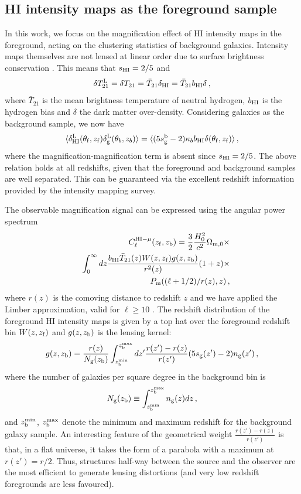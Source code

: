 \documentclass[useAMS,usenatbib]{mnras}
\newcommand{\be}{\begin{equation}}
\newcommand{\ee}{\end{equation}}
\newcommand{\bea}{\begin{eqnarray}}
\newcommand{\eea}{\end{eqnarray}}
\begin{document}
\subsection{ HI intensity maps as the foreground sample}

In this work, we focus on the magnification effect of HI intensity maps in the foreground, acting on the clustering statistics of background galaxies. Intensity maps themselves are not lensed at linear order due to surface brightness conservation \citep{PhysRevD.87.064026}. This means that $s_{\rm HI} = 2/5$ and
\be
\delta T^{\rm L}_{21}=\delta T_{21}=\bar{T}_{21} \delta_{\rm HI} = \bar{T}_{21} b_{\rm HI} \delta \, ,
\ee where $\bar{T}_{21}$ is the mean brightness temperature of neutral hydrogen, $b_{\rm HI}$ is the hydrogen bias and $\delta$ the dark matter over-density. Considering galaxies as the background sample, we now have
\be
\langle \delta^{\rm L}_{\rm HI}(\theta_{\rm f},z_{\rm f}) \delta^{\rm L}_{\rm g}(\theta_b,z_b) \rangle
= \langle (5s^{\rm b}_{\rm g}-2) \kappa_b  b_{\rm HI} \delta (\theta_{\rm f},z_{\rm f}) \rangle \, ,
\ee
where the magnification-magnification term is absent since $s_{\rm HI}=2/5$. The above relation holds at all redshifts, given that the foreground and background samples are well separated. This can be guaranteed via the excellent redshift information provided by the intensity mapping survey.

The observable magnification signal can be expressed using the angular power spectrum \citep{2006MNRAS.367..169Z,2008PhRvD..78l3517Z}
\bea
\label{eq:clhimu}
&&C^{{\rm HI} - \mu}_\ell (z_{\rm f}, z_{\rm b}) = \frac{3}{2}\frac{H^2_0}{c^2}\Omega_{{\rm m},0} \times  \nonumber \\
&& \int^{\infty}_0 dz \frac{b_{\rm HI}\bar{T}_{21}(z)W(z,z_{\rm f})g(z,z_{\rm b})}{r^2(z)}(1+z) \times \nonumber \\
&& P_{\rm m}((\ell+1/2)/r(z),z) \, ,
\eea
where $r(z)$ is the comoving distance to redshift $z$ and we have applied the Limber approximation, valid for $\ell \geq 10$ \citep{1954ApJ...119..655L,2008PhRvD..78l3506L}. The redshift distribution of the foreground HI intensity maps is given by a top hat over the foreground redshift bin $W(z,z_{\rm f})$ and $g(z,z_{\rm b})$ is the lensing kernel:
\be
g(z,z_{\rm b})=\frac{r(z)}{N_{\rm g}(z_{\rm b})}\int^{z_{\rm b}^{\rm max}}_{z_{\rm b}^{\rm min}} dz' \frac{r(z')-r(z)}{r(z')}(5s_{\rm g}(z')-2)n_{\rm g}(z') \, ,
\label{eq:gkernel}
\ee
where the number of galaxies per square degree in the background bin is
\be
N_{\rm g}(z_{\rm b}) \equiv \int_{z_{\rm b}^{\rm min}}^{z_{\rm b}^{\rm max}} n_{\rm g}(z)dz \, ,
\label{eq:ngNg}
\ee
and $z_{\rm b}^{\rm min}$, $z_{\rm b}^{\rm max}$ denote the minimum and maximum redshift for the background galaxy sample. An interesting feature of the geometrical weight $\frac{r(z')-r(z)}{r(z')}$ is that, in a flat universe, it takes the form of a parabola with a maximum at $r(z')=r/2$. Thus, structures half-way between the source and the observer are the most efficient to generate lensing distortions \citep{Kilbinger:2014cea} (and very low redshift foregrounds are less favoured).
\end{document}

